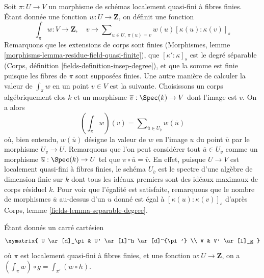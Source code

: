 \medskip\noindent
Soit $\pi : U \to V$ un morphisme de schémas localement quasi-fini à
fibres finies. Étant donnée une fonction $w : U \to \mathbf{Z}$, on définit une fonction
$$
\textstyle{\int}_\pi w : V \longrightarrow \mathbf{Z},\quad
v \longmapsto
\sum\nolimits_{u \in U,\ \pi(u) = v} w(u) [\kappa(u) : \kappa(v)]_s
$$
Remarquons que les extensions de corps sont finies
(Morphismes, lemme \ref{morphisms-lemma-residue-field-quasi-finite}),
que $[\kappa' : \kappa]_s$ est le degré séparable
(Corps, définition \ref{fields-definition-insep-degree}),
et que la somme est finie puisque les fibres de $\pi$ sont supposées finies.
Une autre manière de calculer la valeur de $\int_\pi w$ en un point $v \in V$
est la suivante.
Choisissons un corps algébriquement clos $k$ et un morphisme
$\overline{v} : \Spec(k) \to V$ dont l'image est $v$. On a alors
$$
(\textstyle{\int}_\pi w)(v) =
\sum\nolimits_{\overline{u} \in U_{\overline{v}}} w(\overline{u})
$$
où, bien entendu, $w(\overline{u})$ désigne la valeur de $w$ en
l'image $u$ du point $\overline{u}$ par le morphisme
$U_{\overline{v}} \to U$.
Remarquons que l'on peut considérer tout $\overline{u} \in U_{\overline{v}}$ comme un morphisme
$\overline{u} : \Spec(k) \to U$ tel que
$\pi \circ \overline{u} = \overline{v}$. En effet, puisque
$U \to V$ est localement quasi-fini à fibres finies,
le schéma $U_{\overline{v}}$ est le spectre
d'une algèbre de dimension finie sur $k$ dont tous les idéaux premiers
sont des idéaux maximaux de corps résiduel $k$. Pour voir que l'égalité
est satisfaite, remarquons que le nombre de morphismes $\overline{u}$ au-dessus
d'un $u$ donné est égal à $[\kappa(u) : \kappa(v)]_s$ d'après
Corps, lemme \ref{fields-lemma-separable-degree}.

\begin{lemma}
\label{lemma-weighting-check-after-etale-base-change}
Étant donnés un carré cartésien
$$
\xymatrix{
U \ar[d]_\pi & U' \ar[l]^h \ar[d]^{\pi'} \\
V & V' \ar[l]_g
}
$$
où $\pi$ est localement quasi-fini à fibres finies,
et une fonction $w : U \to \mathbf{Z}$,
on a $(\int_\pi w) \circ g = \int_{\pi'} (w \circ h)$.
\end{lemma}

